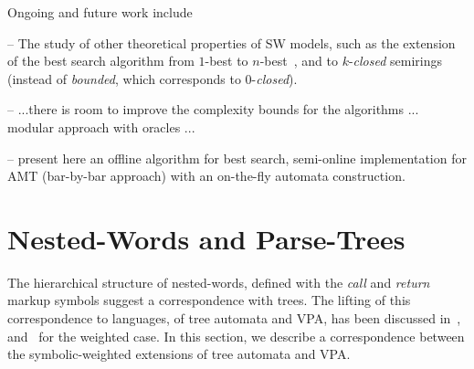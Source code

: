 \noindent
Ongoing and future work include 

\noindent
-- The study of other theoretical properties of SW models, 
such as the extension of the best search algorithm from $1$-best to $n$-best~\cite{Huang05kbest}, 
and to $k$-\emph{closed} semirings~\cite{Mohri02semiring}
(instead of \emph{bounded}, which corresponds to $0$-\emph{closed}).

\noindent
-- ...there is room to improve the complexity bounds for the algorithms
... modular approach with oracles ...

\noindent
-- present here an offline algorithm for best search, 
semi-online implementation for AMT (bar-by-bar approach)
with an on-the-fly automata construction.




%
%
%






\newpage
\appendix 



\section{Nested-Words and Parse-Trees}
\label{sec:trees}
The hierarchical structure of nested-words, defined with the \emph{call} and \emph{return} markup symbols  
suggest a correspondence with trees. 
The lifting of this correspondence to languages, of tree automata and VPA,
has been discussed in~\cite{AlurMadhusudan09nested}, 
and~\cite{Caralp12VPAmult} for the weighted case.
In this section, we describe a correspondence between the symbolic-weighted extensions
of tree automata and VPA.

